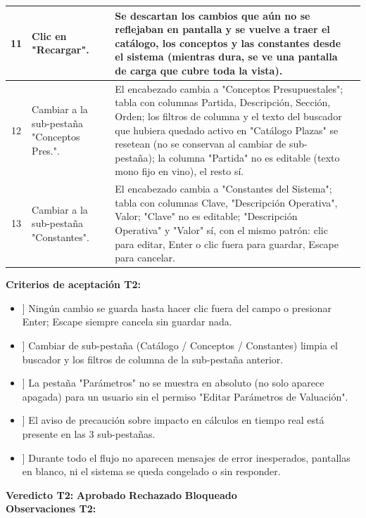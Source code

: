\documentclass[11pt]{article}
\newcommand{\chk}[1]{\CheckBox[name=#1,width=11pt,height=11pt,bordercolor=grisborde,backgroundcolor=1 1 1]{}}
\begin{document}
\begin{Form}
\begin{longtable}{|c|p{6.7cm}|p{6.7cm}|c|}
11 &
Clic en "Recargar". &
Se descartan los cambios que aún no se reflejaban en pantalla y se vuelve a traer el catálogo, los
conceptos y las constantes desde el sistema (mientras dura, se ve una pantalla de carga que cubre
toda la vista). &
\chk{t2r11} \\ \hline

12 &
Cambiar a la sub-pestaña "Conceptos Pres.". &
El encabezado cambia a "Conceptos Presupuestales"; tabla con columnas Partida, Descripción,
Sección, Orden; los filtros de columna y el texto del buscador que hubiera quedado activo en
"Catálogo Plazas" se resetean (no se conservan al cambiar de sub-pestaña); la columna "Partida" no es
editable (texto mono fijo en vino), el resto sí. &
\chk{t2r12} \\ \hline

13 &
Cambiar a la sub-pestaña "Constantes". &
El encabezado cambia a "Constantes del Sistema"; tabla con columnas Clave, "Descripción
Operativa", Valor; "Clave" no es editable; "Descripción Operativa" y "Valor" sí, con el mismo
patrón: clic para editar, Enter o clic fuera para guardar, Escape para cancelar. &
\chk{t2r13} \\ \hline

\end{longtable}
\endgroup

\noindent\textbf{Criterios de aceptación T2:}
\begin{itemize}[leftmargin=1.6em]
  \item[\chk{t2ac1}] Ningún cambio se guarda hasta hacer clic fuera del campo o presionar Enter;
    Escape siempre cancela sin guardar nada.
  \item[\chk{t2ac2}] Cambiar de sub-pestaña (Catálogo / Conceptos / Constantes) limpia el buscador y
    los filtros de columna de la sub-pestaña anterior.
  \item[\chk{t2ac3}] La pestaña "Parámetros" no se muestra en absoluto (no solo aparece apagada) para
    un usuario sin el permiso "Editar Parámetros de Valuación".
  \item[\chk{t2ac4}] El aviso de precaución sobre impacto en cálculos en tiempo real está presente
    en las 3 sub-pestañas.
  \item[\chk{t2ac5}] Durante todo el flujo no aparecen mensajes de error inesperados, pantallas en
    blanco, ni el sistema se queda congelado o sin responder.
\end{itemize}

\vspace{6pt}\noindent
\textbf{Veredicto T2:}\quad
\chk{t2_aprobado} \textbf{Aprobado} \qquad
\chk{t2_rechazado} \textbf{Rechazado} \qquad
\chk{t2_bloqueado} \textbf{Bloqueado}\\[4pt]
\noindent\textbf{Observaciones T2:}\\[4pt]
\TextField[name=obs_t2, width=16cm, height=1.6cm, multiline=true, bordercolor=grisborde, backgroundcolor=0.97 0.98 1]{}


\end{Form}
\end{document}
